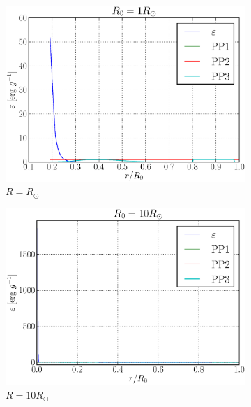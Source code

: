 \documentclass[a4paper, 11pt, english]{article}
\begin{document}
\begin{figure}[htpb]
	\begin{subfigure}{0.49\textwidth}
		\includegraphics[width=\linewidth]{figures/energy_Rsun.eps}
		\caption{$R = R_{\odot}$}
		\label{fig:energy_Rsun}
	\end{subfigure}\hfill
	\begin{subfigure}{0.49\textwidth}
		\includegraphics[width=\linewidth]{figures/energy_10Rsun.eps}
		\caption{$R = 10R_{\odot}$}
		\label{fig:energy_10Rsun}
	\end{subfigure}\hfill
	\vspace{0.35cm}
	\begin{subfigure}{0.49\textwidth}

\end{subfigure}
\end{figure}
\end{document}
